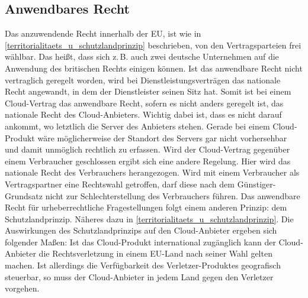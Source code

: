 \subsection{Anwendbares Recht}
Das anzuwendende Recht innerhalb der EU, ist wie in \vref{territorialitaets_u_schutzlandprinzip} beschrieben, von den Vertragsparteien frei w\"ahlbar. Das hei{\ss}t, dass sich z.\,B. auch zwei deutsche Unternehmen auf die Anwendung des britischen Rechts einigen k\"onnen. Ist das anwendbare Recht nicht vertraglich geregelt worden, wird bei Dienstleistungsvertr\"agen das nationale Recht angewandt, in dem der Dienstleister seinen Sitz hat. Somit ist bei einem {\glqq}Cloud-Vertrag{\grqq} das anwendbare Recht, sofern es nicht anders geregelt ist,  das nationale Recht des Cloud-Anbieters. Wichtig dabei ist, dass es nicht darauf ankommt, wo letztlich die Server des Anbieters stehen. Gerade bei einem Cloud-Produkt w\"are m\"oglicherweise der Standort des Servers gar nicht vorhersehbar und damit unm\"oglich rechtlich zu erfassen.\newline
Wird der {\glqq}Cloud-Vertrag{\grqq} gegen\"uber einem Verbraucher geschlossen ergibt sich eine andere Regelung. Hier wird das nationale Recht des Verbrauchers herangezogen. Wird mit einem Verbraucher als Vertragspartner eine Rechtswahl getroffen, darf diese nach dem G\"unstiger-Grundsatz nicht zur Schlechterstellung des Verbrauchers f\"uhren.
Das anwendbare Recht f\"ur urheberrechtliche Fragestellungen folgt einem anderen Prinzip: dem Schutzlandprinzip. N\"aheres dazu in \vref{territorialitaets_u_schutzlandprinzip}.\newline
Die Auswirkungen des Schutzlandprinzips auf den  Cloud-Anbieter ergeben sich folgender Ma{\ss}en:\newline
Ist das Cloud-Produkt international zug\"anglich kann der Cloud-Anbieter die Rechtsverletzung in einem EU-Land nach seiner Wahl gelten machen. Ist allerdings die Verf\"ugbarkeit des Verletzer-Produktes geografisch steuerbar, so muss der Cloud-Anbieter in jedem Land gegen den Verletzer vorgehen. \newline

